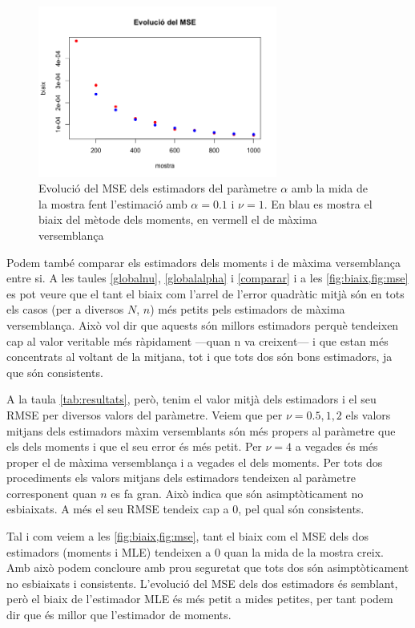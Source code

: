 \documentclass[12pt, catalan]{article}
\numberwithin{table}{section}
\numberwithin{figure}{section}
\numberwithin{equation}{section}
\begin{document}
\begin{figure}[htb]
	\sffamily \small \centering
	\includegraphics[width = 0.7\textwidth]{mse.png}
	\caption{Evolució del MSE dels estimadors del paràmetre \( \alpha \) amb la mida de la mostra fent l'estimació amb \( \alpha = 0.1 \) i \( \nu = 1 \). En blau es mostra el biaix del mètode dels moments, en vermell el de màxima versemblança}
	\label{fig:mse}
\end{figure}
Podem també comparar els estimadors dels moments i de màxima versemblança entre si. A les taules \ref{globalnu}, \ref{globalalpha} i \ref{comparar} i a les \cref{fig:biaix,fig:mse} es pot veure que el tant el biaix com l'arrel de l'error quadràtic mitjà són en tots els casos (per a diversos $N$, $n$) més petits pels estimadors de màxima versemblança. Això vol dir que aquests són millors estimadors perquè tendeixen cap al valor veritable més ràpidament ---quan n va creixent--- i que estan més concentrats al voltant de la mitjana, tot i que tots dos són bons estimadors, ja que són consistents.

A la taula \ref{tab:resultats}, però, tenim el valor mitjà dels estimadors i el seu RMSE per diversos valors del paràmetre. Veiem que per $\nu=0.5,1,2$ els valors mitjans dels estimadors màxim versemblants són més propers al paràmetre que els dels moments i que el seu error és més petit. Per $\nu=4$ a vegades és més proper el de màxima versemblança i a vegades el dels moments. Per tots dos procediments els valors mitjans dels estimadors tendeixen al paràmetre corresponent quan $n$ es fa gran. Això indica que són asimptòticament no esbiaixats. A més el seu RMSE tendeix cap a 0, pel qual són consistents.


Tal i com veiem a les \cref{fig:biaix,fig:mse}, tant el biaix com el MSE dels dos estimadors (moments i MLE) tendeixen a 0 quan la mida de la mostra creix. Amb això podem concloure amb prou seguretat que tots dos són asimptòticament no esbiaixats i consistents. L'evolució del MSE dels dos estimadors és semblant, però el biaix de l'estimador MLE és més petit a mides petites, per tant podem dir que és millor que l'estimador de moments.  
\end{document}
